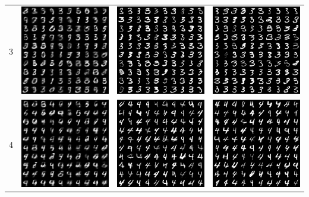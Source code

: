 \documentclass[12pt,a4paper]{article}
\begin{document}
\begin{table}
\begin{tabular}{cccc}
			3 & \includegraphics[width=4cm]{Figures/Epoch1_Label3} & \includegraphics[width=4cm]{Figures/Epoch50_Label3} & \includegraphics[width=4cm]{Figures/Epoch100_Label3}  \\
			4 & \includegraphics[width=4cm]{Figures/Epoch1_Label4} & \includegraphics[width=4cm]{Figures/Epoch50_Label4} & \includegraphics[width=4cm]{Figures/Epoch100_Label4}
		\end{tabular}
	\end{table}
\end{document}

